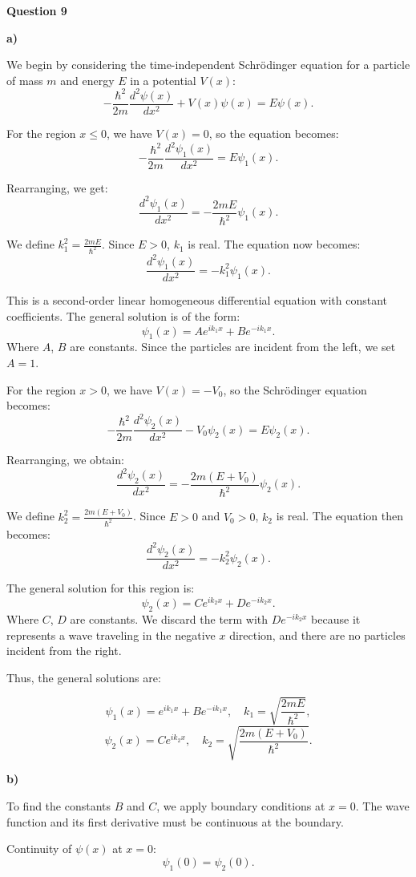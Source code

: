 \documentclass{article}
\begin{document}
\textbf{Question 9}

\textbf{a)}

We begin by considering the time-independent Schrödinger equation for a particle of mass $m$ and energy $E$ in a potential $V(x)$:
\[
-\frac{\hbar^2}{2m} \frac{d^2\psi(x)}{dx^2} + V(x)\psi(x) = E\psi(x).
\]

For the region $x \leq 0$, we have $V(x) = 0$, so the equation becomes:
\[
-\frac{\hbar^2}{2m} \frac{d^2\psi_1(x)}{dx^2} = E\psi_1(x).
\]

Rearranging, we get:
\[
\frac{d^2\psi_1(x)}{dx^2} = -\frac{2mE}{\hbar^2}\psi_1(x).
\]

We define $k_1^2 = \frac{2mE}{\hbar^2}$. Since $E > 0$, $k_1$ is real. The equation now becomes:
\[
\frac{d^2\psi_1(x)}{dx^2} = -k_1^2\psi_1(x).
\]

This is a second-order linear homogeneous differential equation with constant coefficients. The general solution is of the form:
\[
\psi_1(x) = Ae^{ik_1x} + Be^{-ik_1x}.
\]
Where $A$, $B$ are constants. Since the particles are incident from the left, we set $A=1$.

For the region $x > 0$, we have $V(x) = -V_0$, so the Schrödinger equation becomes:
\[
-\frac{\hbar^2}{2m} \frac{d^2\psi_2(x)}{dx^2} - V_0\psi_2(x) = E\psi_2(x).
\]

Rearranging, we obtain:
\[
\frac{d^2\psi_2(x)}{dx^2} = -\frac{2m(E + V_0)}{\hbar^2}\psi_2(x).
\]

We define $k_2^2 = \frac{2m(E + V_0)}{\hbar^2}$. Since $E > 0$ and $V_0 > 0$, $k_2$ is real. The equation then becomes:
\[
\frac{d^2\psi_2(x)}{dx^2} = -k_2^2\psi_2(x).
\]

The general solution for this region is:
\[
\psi_2(x) = Ce^{ik_2x} + De^{-ik_2x}.
\]
Where $C$, $D$ are constants.
We discard the term with $De^{-ik_2x}$ because it represents a wave traveling in the negative $x$ direction, and there are no particles incident from the right.

Thus, the general solutions are:

\[
\psi_1(x) = e^{ik_1x} + Be^{-ik_1x}, \quad k_1 = \sqrt{\frac{2mE}{\hbar^2}},
\]
\[
\psi_2(x) = Ce^{ik_2x}, \quad k_2 = \sqrt{\frac{2m(E + V_0)}{\hbar^2}}.
\]

\textbf{b)}

To find the constants $B$ and $C$, we apply boundary conditions at $x = 0$. The wave function and its first derivative must be continuous at the boundary.

Continuity of $\psi(x)$ at $x = 0$:
\[
\psi_1(0) = \psi_2(0).
\]
\end{document}
